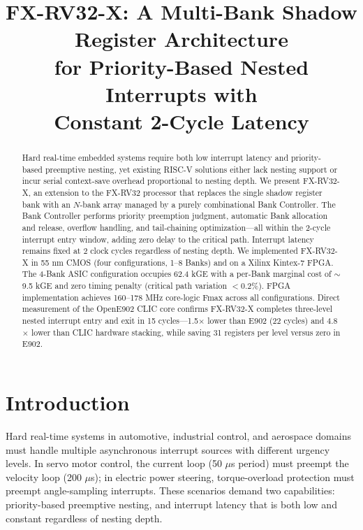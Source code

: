 \documentclass[conference]{IEEEtran}
\begin{document}
\title{FX-RV32-X: A Multi-Bank Shadow Register Architecture\\ for Priority-Based Nested Interrupts with \\ Constant 2-Cycle Latency}

\author{
}

\maketitle

\begin{abstract}
Hard real-time embedded systems require both low interrupt latency and priority-based preemptive nesting, yet existing RISC-V solutions either lack nesting support or incur serial context-save overhead proportional to nesting depth.
We present FX-RV32-X, an extension to the FX-RV32 processor that replaces the single shadow register bank with an $N$-bank array managed by a purely combinational Bank Controller.
The Bank Controller performs priority preemption judgment, automatic Bank allocation and release, overflow handling, and tail-chaining optimization—all within the 2-cycle interrupt entry window, adding zero delay to the critical path.
Interrupt latency remains fixed at 2 clock cycles regardless of nesting depth.
We implemented FX-RV32-X in 55 nm CMOS (four configurations, 1--8 Banks) and on a Xilinx Kintex-7 FPGA.
The 4-Bank ASIC configuration occupies 62.4 kGE with a per-Bank marginal cost of $\sim$9.5 kGE and zero timing penalty (critical path variation $<$0.2\%).
FPGA implementation achieves 160--178 MHz core-logic Fmax across all configurations.
Direct measurement of the OpenE902 CLIC core confirms FX-RV32-X completes three-level nested interrupt entry and exit in 15 cycles—1.5$\times$ lower than E902 (22 cycles) and 4.8$\times$ lower than CLIC hardware stacking, while saving 31 registers per level versus zero in E902.
\end{abstract}

\section{Introduction}

Hard real-time systems in automotive, industrial control, and aerospace domains must handle multiple asynchronous interrupt sources with different urgency levels.
In servo motor control, the current loop (50 $\mu$s period) must preempt the velocity loop (200 $\mu$s); in electric power steering, torque-overload protection must preempt angle-sampling interrupts.
These scenarios demand two capabilities: priority-based preemptive nesting, and interrupt latency that is both low and constant regardless of nesting depth.
\end{document}
